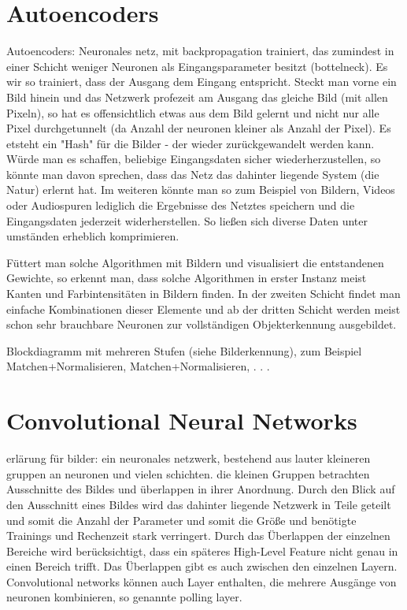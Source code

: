 \section{Autoencoders}

Autoencoders: Neuronales netz, mit backpropagation trainiert, das zumindest in einer Schicht weniger Neuronen als Eingangsparameter besitzt (bottelneck). Es wir so trainiert, dass der Ausgang dem Eingang entspricht. Steckt man vorne ein Bild hinein und das Netzwerk profezeit am Ausgang das gleiche Bild (mit allen Pixeln), so hat es offensichtlich etwas aus dem Bild gelernt und nicht nur alle Pixel durchgetunnelt (da Anzahl der neuronen kleiner als Anzahl der Pixel).
Es etsteht ein "Hash" für die Bilder - der wieder zurückgewandelt werden kann. Würde man es schaffen, beliebige Eingangsdaten sicher wiederherzustellen, so könnte man davon sprechen, dass das Netz das dahinter liegende System (die Natur) erlernt hat. Im weiteren könnte man so zum Beispiel von Bildern, Videos oder Audiospuren lediglich die Ergebnisse des Netztes speichern und die Eingangsdaten jederzeit widerherstellen. So ließen sich diverse Daten unter umständen erheblich komprimieren.

Füttert man solche Algorithmen mit Bildern und visualisiert die entstandenen Gewichte, so erkennt man, dass solche Algorithmen in erster Instanz meist Kanten und Farbintensitäten in Bildern finden. In der zweiten Schicht findet man einfache Kombinationen dieser Elemente und ab der dritten Schicht werden meist schon sehr brauchbare Neuronen zur vollständigen Objekterkennung ausgebildet.

Blockdiagramm mit mehreren Stufen (siehe Bilderkennung), zum Beispiel Matchen+Normalisieren, Matchen+Normalisieren, . . .


\section{Convolutional Neural Networks}


erlärung für bilder:
ein neuronales netzwerk, bestehend aus lauter kleineren gruppen an neuronen und vielen schichten. die kleinen Gruppen betrachten Ausschnitte des Bildes und überlappen in ihrer Anordnung. Durch den Blick auf den Ausschnitt eines Bildes wird das dahinter liegende Netzwerk in Teile geteilt und somit die Anzahl der Parameter und somit die Größe und benötigte Trainings und Rechenzeit stark verringert. Durch das Überlappen der einzelnen Bereiche wird berücksichtigt, dass ein späteres High-Level Feature nicht genau in einen Bereich trifft.
Das Überlappen gibt es auch zwischen den einzelnen Layern.
Convolutional networks können auch Layer enthalten, die mehrere Ausgänge von neuronen kombinieren, so genannte polling layer.

